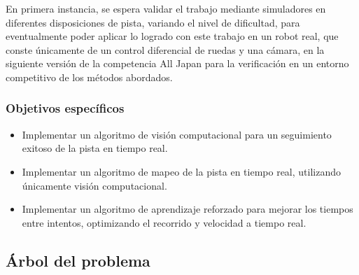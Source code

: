 En primera instancia, se espera validar el trabajo mediante simuladores en diferentes disposiciones de pista, variando el nivel de dificultad, para eventualmente poder aplicar lo logrado con este trabajo en un robot real, que conste únicamente de un control diferencial de ruedas y una cámara, en la siguiente versión de la competencia All Japan para la verificación en un entorno competitivo de los métodos abordados.

\subsubsection{Objetivos específicos}

\begin{itemize}
	\item Implementar un algoritmo de visión computacional para un seguimiento exitoso de la pista en tiempo real.
	\item Implementar un algoritmo de mapeo de la pista en tiempo real, utilizando únicamente visión computacional.
	\item Implementar un algoritmo de aprendizaje reforzado para mejorar los tiempos entre intentos, optimizando el recorrido y velocidad a tiempo real.
\end{itemize}
\newpage
\subsection{Árbol del problema}

